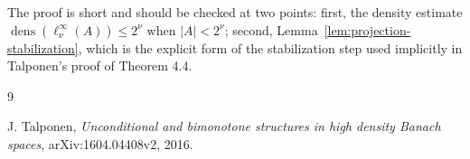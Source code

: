 \documentclass[11pt]{article}
\newcommand{\dens}{\operatorname{dens}}
\begin{document}
The proof is short and should be checked at two points: first, the density
estimate \(\dens(\ell_\nu^\infty(A))\leq 2^\nu\) when \(|A|<2^\nu\); second,
Lemma~\ref{lem:projection-stabilization}, which is the explicit form of the
stabilization step used implicitly in Talponen's proof of Theorem 4.4.

\begin{thebibliography}{9}

J. Talponen,
\emph{Unconditional and bimonotone structures in high density Banach spaces},
arXiv:1604.04408v2, 2016.

\end{thebibliography}
\end{document}
